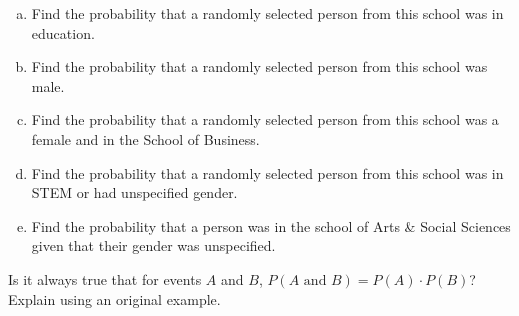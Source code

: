 \documentclass[11pt,letterpaper]{article}
\begin{document}
\begin{enumerate}[(a)]
\item Find the probability that a randomly selected person from this school was in education. 
\item Find the probability that a randomly selected person from this school was male.
\item Find the probability that a randomly selected person from this school was a female and in the School of Business.
\item Find the probability that a randomly selected person from this school was in STEM or had unspecified gender.
\item Find the probability that a person was in the school of Arts \& Social Sciences given that their gender was unspecified. 
\end{enumerate}



\newpage



 Is it always true that for events $A$ and $B$, $P(A \text{ and } B)= P(A) \cdot P(B)$? Explain using an original example. 
\end{document}
